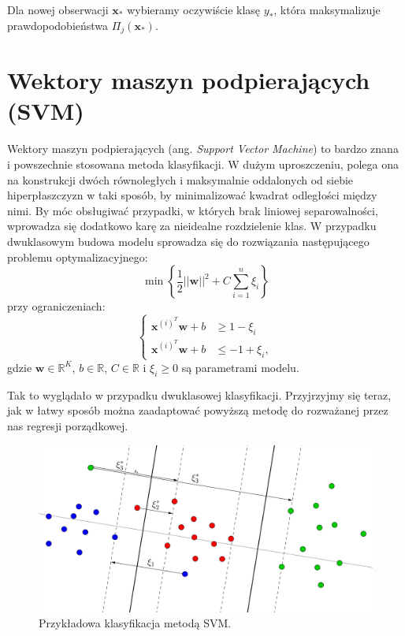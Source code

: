 \documentclass{mini}
\begin{document}
Dla nowej obserwacji $\mathbf{x}_{\ast}$ wybieramy oczywiście klasę $y_{\ast}$, która maksymalizuje prawdopodobieństwa $\Pi_j(\mathbf{x}_{\ast})$.

\section{Wektory maszyn podpierających (SVM)}

Wektory maszyn podpierających (ang. \textit{Support Vector Machine}) to bardzo znana i powszechnie stosowana metoda klasyfikacji. W dużym uproszczeniu, polega ona na konstrukcji dwóch równoległych i maksymalnie oddalonych od siebie hiperpłaszczyzn w taki sposób, by minimalizować kwadrat odległości między nimi. By móc obsługiwać przypadki, w których brak liniowej separowalności, wprowadza się dodatkowo karę za nieidealne rozdzielenie klas. W przypadku dwuklasowym budowa modelu sprowadza się do rozwiązania następującego problemu optymalizacyjnego:
$$
\min\left\lbrace\dfrac{1}{2}||\textbf{w}||^2+C\sum_{i=1}^{n}\xi_i\right\rbrace
$$
przy ograniczeniach:
$$
\begin{cases}
\mathbf{x}^{(i)^T}\textbf{w}+b &\geq 1-\xi_i\\
\mathbf{x}^{(i)^T}\textbf{w}+b &\leq -1+\xi_i,
\end{cases}
$$    
gdzie $\mathbf{w}\in\mathbb{R}^K$, $b\in\mathbb{R}$, $C\in\mathbb{R}$ i $\xi_i\geq 0$ są parametrami modelu.

Tak to wyglądało w przypadku dwuklasowej klasyfikacji. Przyjrzyjmy się teraz, jak w łatwy sposób można zaadaptować powyższą metodę do rozważanej przez nas regresji porządkowej.

\begin{figure}[h]
\begin{center}
\includegraphics[width=\textwidth]{svm3.png}
\end{center}
\caption{Przykładowa klasyfikacja metodą SVM.}
\end{figure}
\end{document}
